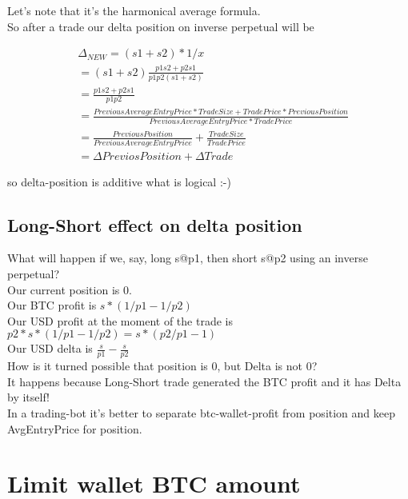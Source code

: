 \documentclass{article}
\begin{document}
Let's note that it's the harmonical average formula. \\

So after a trade our delta position on inverse perpetual will be

\begin{align*}
& \Delta_{NEW} = (s1 + s2) * 1 / x \\
& = (s1 + s2) \frac{p1 s2 + p2 s1}{p1 p2 (s1 + s2)} \\
& = \frac{p1 s2 + p2 s1}{p1 p2} \\
& = \frac{PreviousAverageEntryPrice * TradeSize + TradePrice * PreviousPosition}{PreviousAverageEntryPrice * TradePrice} \\
& = \frac{PreviousPosition}{PreviousAverageEntryPrice} + \frac{TradeSize}{TradePrice} \\ 
& = \Delta PreviosPosition + \Delta Trade
\end{align*}

so delta-position is additive what is logical :-) \\

\subsection{Long-Short effect on delta position}

What will happen if we, say, long s@p1, then short s@p2 using an inverse perpetual? \\

Our current position is 0. \\

Our BTC profit is $ s * (1/p1-1/p2) $ \\

Our USD profit at the moment of the trade is $ p2 * s * (1/p1-1/p2) = s * (p2/p1 - 1) $ \\

Our USD delta is $ \frac{s}{p1} - \frac{s}{p2} $ \\

How is it turned possible that position is 0, but Delta is not 0? \\

It happens because Long-Short trade generated the BTC profit and it has Delta by itself! \\

In a trading-bot it's better to separate btc-wallet-profit from position and keep AvgEntryPrice for position.

\section{Limit wallet BTC amount}
\end{document}
